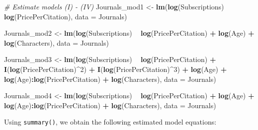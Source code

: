 \documentclass[]{book}
\newenvironment{Shaded}{\begin{snugshade}}{\end{snugshade}}
\newcommand{\KeywordTok}[1]{\textcolor[rgb]{0.13,0.29,0.53}{\textbf{#1}}}
\newcommand{\DataTypeTok}[1]{\textcolor[rgb]{0.13,0.29,0.53}{#1}}
\newcommand{\DecValTok}[1]{\textcolor[rgb]{0.00,0.00,0.81}{#1}}
\newcommand{\StringTok}[1]{\textcolor[rgb]{0.31,0.60,0.02}{#1}}
\newcommand{\CommentTok}[1]{\textcolor[rgb]{0.56,0.35,0.01}{\textit{#1}}}
\newcommand{\OperatorTok}[1]{\textcolor[rgb]{0.81,0.36,0.00}{\textbf{#1}}}
\newcommand{\NormalTok}[1]{#1}
\theoremstyle{definition}
\theoremstyle{definition}
\theoremstyle{definition}
\theoremstyle{remark}
\begin{document}
\begin{Shaded}
\begin{Highlighting}[]
\CommentTok{# Estimate models (I) - (IV)}
\NormalTok{Journals_mod1 <-}\StringTok{ }\KeywordTok{lm}\NormalTok{(}\KeywordTok{log}\NormalTok{(Subscriptions) }\OperatorTok{~}\StringTok{ }\KeywordTok{log}\NormalTok{(PricePerCitation), }\DataTypeTok{data =}\NormalTok{ Journals)}

\NormalTok{Journals_mod2 <-}\StringTok{ }\KeywordTok{lm}\NormalTok{(}\KeywordTok{log}\NormalTok{(Subscriptions) }\OperatorTok{~}\StringTok{ }\KeywordTok{log}\NormalTok{(PricePerCitation) }\OperatorTok{+}\StringTok{ }\KeywordTok{log}\NormalTok{(Age) }\OperatorTok{+}\StringTok{ }
\StringTok{    }\KeywordTok{log}\NormalTok{(Characters), }\DataTypeTok{data =}\NormalTok{ Journals)}

\NormalTok{Journals_mod3 <-}\StringTok{ }\KeywordTok{lm}\NormalTok{(}\KeywordTok{log}\NormalTok{(Subscriptions) }\OperatorTok{~}\StringTok{ }\KeywordTok{log}\NormalTok{(PricePerCitation) }\OperatorTok{+}\StringTok{ }\KeywordTok{I}\NormalTok{(}\KeywordTok{log}\NormalTok{(PricePerCitation)}\OperatorTok{^}\DecValTok{2}\NormalTok{) }\OperatorTok{+}\StringTok{ }
\StringTok{    }\KeywordTok{I}\NormalTok{(}\KeywordTok{log}\NormalTok{(PricePerCitation)}\OperatorTok{^}\DecValTok{3}\NormalTok{) }\OperatorTok{+}\StringTok{ }\KeywordTok{log}\NormalTok{(Age) }\OperatorTok{+}\StringTok{ }\KeywordTok{log}\NormalTok{(Age)}\OperatorTok{:}\KeywordTok{log}\NormalTok{(PricePerCitation) }\OperatorTok{+}\StringTok{ }
\StringTok{    }\KeywordTok{log}\NormalTok{(Characters), }\DataTypeTok{data =}\NormalTok{ Journals)}

\NormalTok{Journals_mod4 <-}\StringTok{ }\KeywordTok{lm}\NormalTok{(}\KeywordTok{log}\NormalTok{(Subscriptions) }\OperatorTok{~}\StringTok{ }\KeywordTok{log}\NormalTok{(PricePerCitation) }\OperatorTok{+}\StringTok{ }\KeywordTok{log}\NormalTok{(Age) }\OperatorTok{+}\StringTok{ }
\StringTok{    }\KeywordTok{log}\NormalTok{(Age)}\OperatorTok{:}\KeywordTok{log}\NormalTok{(PricePerCitation) }\OperatorTok{+}\StringTok{ }\KeywordTok{log}\NormalTok{(Characters), }\DataTypeTok{data =}\NormalTok{ Journals)}
\end{Highlighting}
\end{Shaded}

Using \texttt{summary()}, we obtain the following estimated model
equations:
\end{document}
